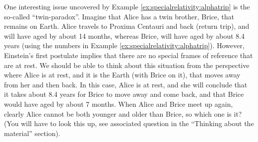 One interesting issue uncovered by Example \ref{ex:specialrelativity:alphatrip} is the so-called ``twin-paradox''. Imagine that Alice has a twin brother, Brice, that remains on Earth. Alice travels to Proxima Centauri and back (return trip), and will have aged by about 14 months, whereas Brice, will have aged by about 8.4 years (using the numbers in Example \ref{ex:specialrelativity:alphatrip}). However, Einstein's first postulate implies that there are no special frames of reference that are at rest. We should be able to think about this situation from the perspective where Alice is at rest, and it is the Earth (with Brice on it), that moves away from her and then back. In this case, Alice is at rest, and she will conclude that it takes about 8.4 years for Brice to move away and come back, and that Brice would have aged by about 7 months. When Alice and Brice meet up again, clearly Alice cannot be both younger and older than Brice, so which one is it? (You will have to look this up, see associated question in the ``Thinking about the material'' section).

